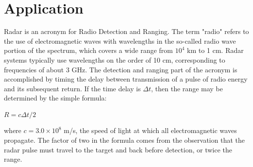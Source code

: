 \documentclass[a4paper,12pt]{report}
\begin{document}
\chapter{Application}
 Radar is an acronym for Radio Detection and Ranging.  The term "radio"  
 refers to the use of electromagnetic waves with wavelengths in the so-called radio 
 wave portion of the spectrum, which covers a wide range from $10^{4}$ km to 1 cm.  Radar 
 systems typically use wavelengths on the order of 10 cm, corresponding to frequencies 
 of about 3 GHz.  The detection and ranging part of the acronym is accomplished by 
 timing the delay between transmission of a pulse of radio energy and its subsequent 
 return.  If the time delay is $\Delta$$ t$, then the range may be determined by the simple 
 formula:
\begin{center}
	$R=c\Delta t/2$
\end{center}
where $c=3.0\times10^{8}$ m/s, the speed of light at which all electromagnetic waves propagate.
The factor of two in the formula comes from the observation that the radar pulse must 
travel to the target and back before detection, or twice the range.   
\end{document}
